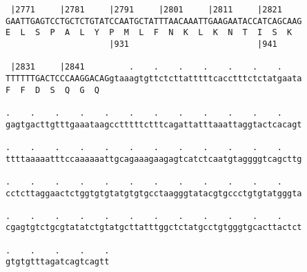 \documentclass{article}
\begin{document}
\begin{Verbatim}
 |2771     |2781     |2791     |2801     |2811     |2821    
GAATTGAGTCCTGCTCTGTATCCAATGCTATTTAACAAATTGAAGAATACCATCAGCAAG
E  L  S  P  A  L  Y  P  M  L  F  N  K  L  K  N  T  I  S  K  
                     |931                          |941     
  
 |2831     |2841         .    .    .    .    .    .    .    
TTTTTTGACTCCCAAGGACAGgtaaagtgttctcttatttttcacctttctctatgaata
F  F  D  S  Q  G  Q                                         
  
.    .    .    .    .    .    .    .    .    .    .    .    
gagtgacttgtttgaaataagcctttttctttcagattatttaaattaggtactcacagt
  
.    .    .    .    .    .    .    .    .    .    .    .    
ttttaaaaatttccaaaaaattgcagaaagaagagtcatctcaatgtaggggtcagcttg
  
.    .    .    .    .    .    .    .    .    .    .    .    
cctcttaggaactctggtgtgtatgtgtgcctaagggtatacgtgccctgtgtatgggta
  
.    .    .    .    .    .    .    .    .    .    .    .    
cgagtgtctgcgtatatctgtatgcttatttggctctatgcctgtgggtgcacttactct
  
.    .    .    .    .
gtgtgtttagatcagtcagtt
\end{Verbatim}
\newpage
\end{document}
